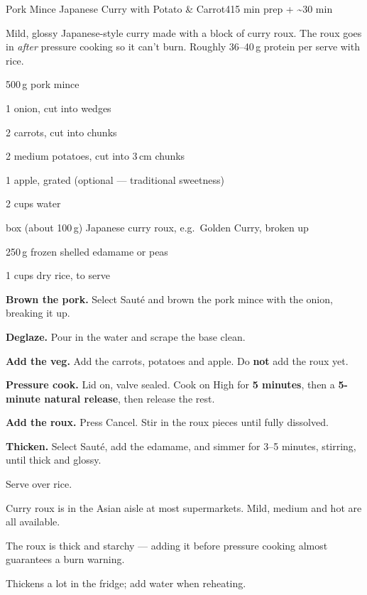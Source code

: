 \begin{recipebox}{Pork Mince Japanese Curry with Potato \& Carrot}{4}{15 min prep + \textasciitilde30 min}

Mild, glossy Japanese-style curry made with a block of curry roux. The roux
goes in \emph{after} pressure cooking so it can't burn. Roughly 36--40\,g
protein per serve with rice.

\begin{ingredients}
  \item 500\,g pork mince
  \item 1 onion, cut into wedges
  \item 2 carrots, cut into chunks
  \item 2 medium potatoes, cut into 3\,cm chunks
  \item 1 apple, grated (optional --- traditional sweetness)
  \item 2 cups water
  \item {} box (about 100\,g) Japanese curry roux, e.g.\ Golden Curry, broken up
  \item 250\,g frozen shelled edamame or peas
  \item 1 cups dry rice, to serve
\end{ingredients}

\begin{method}
  \item \textbf{Brown the pork.} Select Saut\'e and brown the pork mince with the onion, breaking it up.
  \item \textbf{Deglaze.} Pour in the water and scrape the base clean.
  \item \textbf{Add the veg.} Add the carrots, potatoes and apple. Do \textbf{not} add the roux yet.
  \item \textbf{Pressure cook.} Lid on, valve sealed. Cook on High for \textbf{5 minutes}, then a \textbf{5-minute natural release}, then release the rest.
  \item \textbf{Add the roux.} Press Cancel. Stir in the roux pieces until fully dissolved.
  \item \textbf{Thicken.} Select Saut\'e, add the edamame, and simmer for 3--5 minutes, stirring, until thick and glossy.
  \item Serve over rice.
\end{method}

\begin{notelist}
  \item Curry roux is in the Asian aisle at most supermarkets. Mild, medium and hot are all available.
  \item The roux is thick and starchy --- adding it before pressure cooking almost guarantees a burn warning.
  \item Thickens a lot in the fridge; add water when reheating.
\end{notelist}

\end{recipebox}

